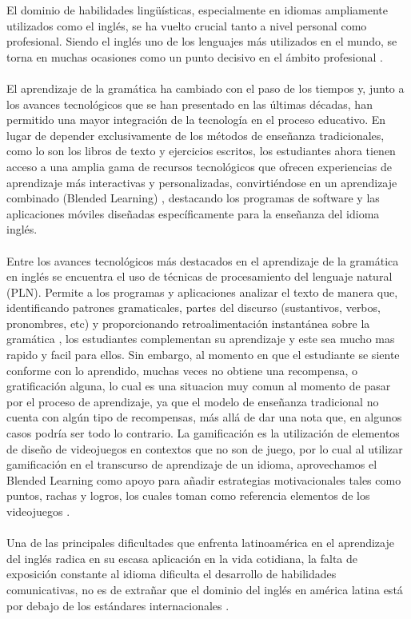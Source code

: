 El dominio de habilidades lingüísticas, especialmente en idiomas ampliamente utilizados como el inglés, se ha vuelto crucial tanto a nivel personal como profesional. Siendo el inglés uno de los lenguajes más utilizados en el mundo, se torna en muchas ocasiones como un punto decisivo en el ámbito profesional \cite{eaii}. 
\\
\\
El aprendizaje de la gramática ha cambiado con el paso de los tiempos y, junto a los avances tecnológicos que se han presentado en las últimas décadas, han permitido una mayor integración de la tecnología en el proceso educativo. En lugar de depender exclusivamente de los métodos de enseñanza tradicionales, como lo son los libros de texto y ejercicios escritos, los estudiantes ahora tienen acceso a una amplia gama de recursos tecnológicos que ofrecen experiencias de aprendizaje más interactivas y personalizadas, convirtiéndose en un aprendizaje combinado (Blended Learning) \cite{salinas2010entrenamiento}, destacando los programas de software y las aplicaciones móviles diseñadas específicamente para la enseñanza del idioma inglés.
\\
\\
Entre los avances tecnológicos más destacados en el aprendizaje de la gramática en inglés se encuentra el uso de técnicas de procesamiento del lenguaje natural (PLN). Permite a los programas y aplicaciones analizar el texto de manera que, identificando patrones gramaticales, partes del discurso (sustantivos, verbos, pronombres, etc) y proporcionando retroalimentación instantánea sobre la gramática \cite{alhawiti2014natural}, los estudiantes complementan su aprendizaje y este sea mucho mas rapido y facil para ellos. Sin embargo, al momento en que el estudiante se siente conforme con lo aprendido, muchas veces no obtiene una recompensa, o gratificación alguna, lo cual es una situacion muy comun al momento de pasar por el proceso de aprendizaje, ya que el modelo de enseñanza tradicional no cuenta con algún tipo de recompensas, más allá de dar una nota que, en algunos casos podría ser todo lo contrario. La gamificación es la utilización de elementos de diseño de videojuegos en contextos que no son de juego, por lo cual al utilizar gamificación en el transcurso de aprendizaje de un idioma, aprovechamos el Blended Learning como apoyo para añadir estrategias motivacionales tales como puntos, rachas y logros, los cuales toman como referencia elementos de los videojuegos \cite{flores2015using}.
\\
\\
Una de las principales dificultades que enfrenta latinoamérica en el aprendizaje del inglés radica en su escasa aplicación en la vida cotidiana, la falta de exposición constante al idioma dificulta el desarrollo de habilidades comunicativas, no es de extrañar que el dominio del inglés en américa latina está por debajo de los estándares internacionales \cite{cronquist2017aprendizaje}.
\\
\\


 